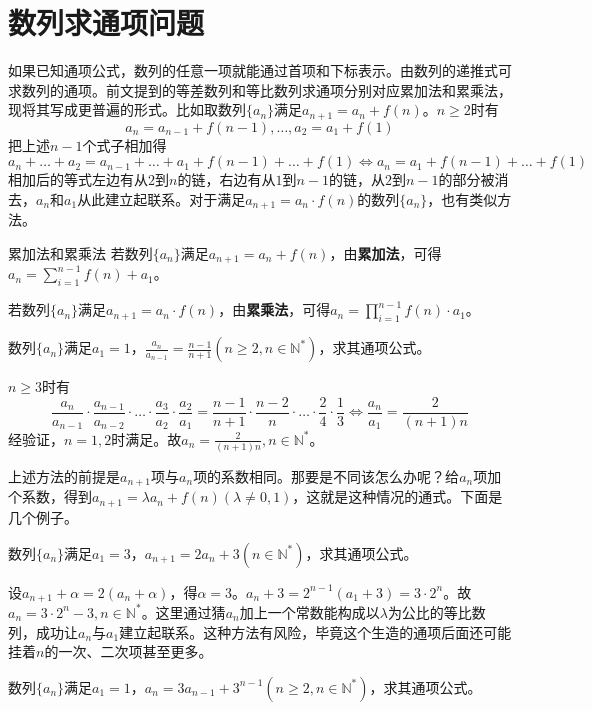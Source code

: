 \documentclass[../sample]{subfiles}
\begin{document}
\section{数列求通项问题}
如果已知通项公式，数列的任意一项就能通过首项和下标表示。由数列的递推式可求数列的通项。前文提到的等差数列和等比数列求通项分别对应累加法和累乘法，现将其写成更普遍的形式。比如取数列$\{a_n\}$满足$a_{n+1}=a_{n}+f(n)$。$n\geq 2$时有\[a_{n}=a_{n-1}+f(n-1), \dots, a_{2}=a_{1}+f(1)\]
把上述$n-1$个式子相加得\[a_{n}+\dots+a_{2}=a_{n-1}+\dots+a_{1}+f(n-1)+\dots+f(1)\Leftrightarrow a_{n}=a_{1}+f(n-1)+\dots+f(1)\]
相加后的等式左边有从$2$到$n$的链，右边有从$1$到$n-1$的链，从$2$到$n-1$的部分被消去，$a_n$和$a_1$从此建立起联系。对于满足$a_{n+1}=a_{n}·f(n)$的数列$\{a_n\}$，也有类似方法。

\begin{theorem}{累加法和累乘法}
  若数列$\{a_n\}$满足$a_{n+1}=a_{n}+f(n)$，由\textbf{累加法}，可得$a_{n}=\sum_{i=1}^{n-1}f(n)+a_1$。
  
  若数列$\{a_n\}$满足$a_{n+1}=a_{n}·f(n)$，由\textbf{累乘法}，可得$a_{n}=\prod_{i=1}^{n-1}f(n)·a_1$。
\end{theorem}

\begin{problem}
  数列$\{a_n\}$满足$a_1=1$，$\frac{a_n}{a_{n-1}}=\frac{n-1}{n+1}(n\geq 2, n\in\mathbb{N^*})$，求其通项公式。
\end{problem}

$n\geq 3$时有\[\frac{a_n}{a_{n-1}}·\frac{a_{n-1}}{a_{n-2}}·\dots·\frac{a_3}{a_2}·\frac{a_2}{a_{1}}=\frac{n-1}{n+1}·\frac{n-2}{n}·\dots·\frac{2}{4}·\frac{1}{3}\Leftrightarrow \frac{a_n}{a_{1}}=\frac{2}{(n+1)n}\]
经验证，$n=1,2$时满足。故$a_n=\frac{2}{(n+1)n},n\in\mathbb{N^*}$。

上述方法的前提是$a_{n+1}$项与$a_n$项的系数相同。那要是不同该怎么办呢？给$a_n$项加个系数，得到$a_{n+1}=\lambda a_{n}+f(n)(\lambda\neq 0, 1)$，这就是这种情况的通式。下面是几个例子。

\begin{problem}
  数列$\{a_n\}$满足$a_1=3$，$a_{n+1}=2a_{n}+3(n\in\mathbb{N^*})$，求其通项公式。
\end{problem}

设$a_{n+1}+\alpha=2(a_n+\alpha)$，得$\alpha=3$。$a_n+3=2^{n-1}(a_1+3)=3·2^n$。故$a_n=3·2^n-3, n\in\mathbb{N^*}$。这里通过猜$a_n$加上一个常数能构成以$\lambda$为公比的等比数列，成功让$a_n$与$a_1$建立起联系。这种方法有风险，毕竟这个生造的通项后面还可能挂着$n$的一次、二次项甚至更多。

\begin{problem}
  数列$\{a_n\}$满足$a_1=1$，$a_{n}=3a_{n-1}+3^{n-1}(n\geq 2, n\in\mathbb{N^*})$，求其通项公式。
\end{problem}
\end{document}
